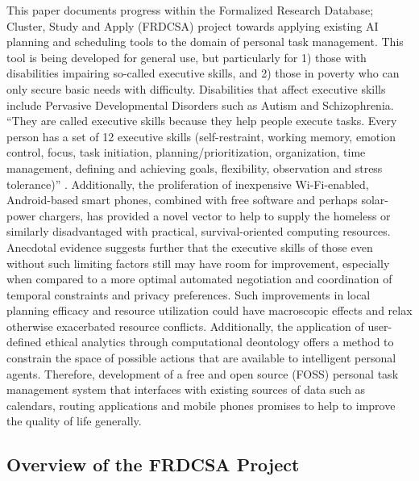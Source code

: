 \documentclass[letterpaper]{article}
\begin{document}
This paper documents progress within the Formalized Research Database;
Cluster, Study and Apply (FRDCSA) project towards applying existing AI
planning and scheduling tools to the domain of personal task
management.  This tool is being developed for general use, but
particularly for 1) those with disabilities impairing so-called
executive skills, and 2) those in poverty who can only secure basic
needs with difficulty.  Disabilities that affect executive skills
include Pervasive Developmental Disorders such as Autism and
Schizophrenia.  ``They are called executive skills because they help
people execute tasks.  Every person has a set of 12 executive skills
(self-restraint, working memory, emotion control, focus, task
initiation, planning/prioritization, organization, time management,
defining and achieving goals, flexibility, observation and stress
tolerance)'' \cite{cio2006}.  Additionally, the proliferation of
inexpensive Wi-Fi-enabled, Android-based smart phones, combined with
free software and perhaps solar-power chargers, has provided a novel
vector to help to supply the homeless or similarly disadvantaged with
practical, survival-oriented computing resources.  Anecdotal evidence
suggests further that the executive skills of those even without such
limiting factors still may have room for improvement, especially when
compared to a more optimal automated negotiation and coordination of
temporal constraints and privacy preferences.  Such improvements in
local planning efficacy and resource utilization could have
macroscopic effects and relax otherwise exacerbated resource
conflicts.  Additionally, the application of user-defined ethical
analytics through computational deontology offers a method to
constrain the space of possible actions that are available to
intelligent personal agents.  Therefore, development of a free and
open source (FOSS) personal task management system that interfaces
with existing sources of data such as calendars, routing applications
and mobile phones promises to help to improve the quality of life
generally.

\subsection{Overview of the FRDCSA Project}
\end{document}
